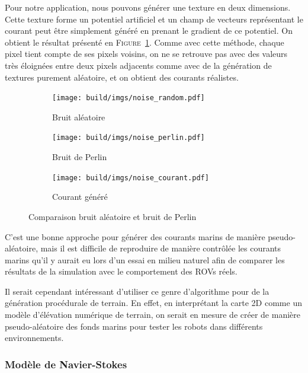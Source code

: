 				Pour notre application, nous pouvons générer une texture en deux dimensions. Cette texture forme un potentiel artificiel et un champ de vecteurs représentant le courant peut être simplement généré en prenant le gradient de ce potentiel. On obtient le résultat présenté en \textsc{Figure}~\ref{fig:perlin_noise}. Comme avec cette méthode, chaque pixel tient compte de ses pixels voisins, on ne se retrouve pas avec des valeurs très éloignées entre deux pixels adjacents comme avec de la génération de textures purement aléatoire, et on obtient des courants réalistes.

				\begin{figure}[!htb]
					\centering
					\begin{subfigure}[b]{0.32\textwidth}
						\centering
						\texttt{[image: build/imgs/noise\_random.pdf]}
						\caption{Bruit aléatoire}
					\end{subfigure}
					\hfill
					\begin{subfigure}[b]{0.32\textwidth}
						\centering
						\texttt{[image: build/imgs/noise\_perlin.pdf]}
						\caption{Bruit de Perlin}
					\end{subfigure}
					\hfill
					\begin{subfigure}[b]{0.32\textwidth}
						\centering
						\texttt{[image: build/imgs/noise\_courant.pdf]}
						\caption{Courant généré}
					\end{subfigure}
					\caption{Comparaison bruit aléatoire et bruit de Perlin}
					\label{fig:perlin_noise}
				\end{figure}

				C'est une bonne approche pour générer des courants marins de manière pseudo-aléatoire, mais il est difficile de reproduire de manière contrôlée les courants marins qu'il y aurait eu lors d'un essai en milieu naturel afin de comparer les résultats de la simulation avec le comportement des \gls{ROV}s réels.
				
				Il serait cependant intéressant d'utiliser ce genre d'algorithme pour de la génération procédurale de terrain. En effet, en interprétant la carte 2D comme un modèle d'élévation numérique de terrain, on serait en mesure de créer de manière pseudo-aléatoire des fonds marins pour tester les robots dans différents environnements.

			\subsubsection{Modèle de Navier-Stokes}

